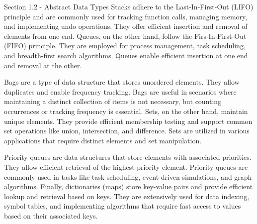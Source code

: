 \begin{notes}{Section 1.2 - Abstract Data Types}
    Stacks adhere to the Last-In-First-Out (LIFO) principle and are commonly used for tracking function calls, managing memory, and implementing undo operations. They offer efficient insertion and removal
    of elements from one end. Queues, on the other hand, follow the Firs-In-First-Out (FIFO) principle. They are employed for process management, task scheduling, and breadth-first search algorithms. Queues enable
    efficient insertion at one end and removal at the other.
    
    Bags are a type of data structure that stores unordered elements. They allow duplicates and enable frequency tracking. Bags are useful in scenarios where maintaining a distinct collection of items is not
    necessary, but counting occurrences or tracking frequency is essential. Sets, on the other hand, maintain unique elements. They provide efficient membership testing and support common set operations like union,
    intersection, and difference. Sets are utilized in various applications that require distinct elements and set manipulation.
    
    Priority queues are data structures that store elements with associated priorities. They allow efficient retrieval of the highest priority element. Priority queues are commonly used in tasks like task
    scheduling, event-driven simulations, and graph algorithms. Finally, dictionaries (maps) store key-value pairs and provide efficient lookup and retrieval based on keys. They are extensively used for data indexing,
    symbol tables, and implementing algorithms that require fast access to values based on their associated keys.
\end{notes}

